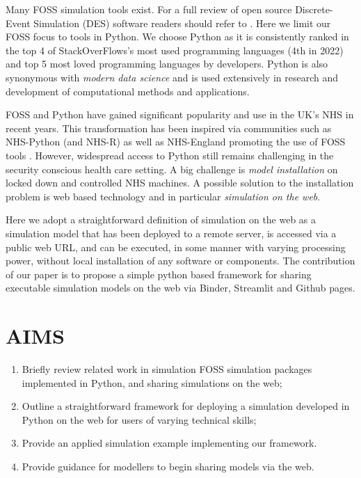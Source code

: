 \documentclass{swpaperproc}
\theoremstyle{sw}
\begin{document}
Many FOSS simulation tools exist. For a full review of open source Discrete-Event Simulation (DES) software readers should refer to .  Here we limit our FOSS focus to tools in Python.  We choose Python as it is consistently ranked in the top 4 of StackOverFlows's most used programming languages (4th in 2022) and top 5 most loved programming languages by developers.  Python is also synonymous with \textit{modern data science} and is used extensively in research and development of computational methods and applications.

FOSS and Python have gained significant popularity and use in the UK's NHS in recent years. This transformation has been inspired via communities such as NHS-Python (and NHS-R) as well as NHS-England promoting the use of FOSS tools \cite{nhs_england_os}.  However, widespread access to Python still remains challenging in the security conscious health care setting.  A big challenge is \textit{model installation} on locked down and controlled NHS machines. A possible solution to the installation problem is web based technology and in particular \textit{simulation on the web}.

Here we adopt a straightforward definition of simulation on the web as a simulation model that has been deployed to a remote server, is accessed via a public web URL, and can be executed, in some manner with varying processing power, without local installation of any software or components.  The contribution of our paper is to propose a simple python based framework for sharing executable simulation models on the web via Binder, Streamlit and Github pages.

\section{AIMS}
\label{sec:aims}
\begin{enumerate}
    \item Briefly review related work in simulation FOSS simulation packages implemented in Python, and sharing simulations on the web;
    \item Outline a straightforward framework for deploying a simulation developed in Python on the web for users of varying technical skills;
    \item Provide an applied simulation example implementing our framework.
    \item Provide guidance for modellers to begin sharing models via the web.
\end{enumerate}
\end{document}
